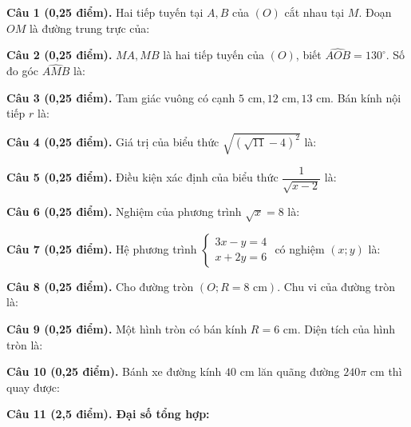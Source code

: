 \documentclass[12pt,a4paper]{article}
\begin{document}
\vspace{1.2mm}
\noindent\textbf{Câu 1 (0,25 điểm).} Hai tiếp tuyến tại $A, B$ của $(O)$ cắt nhau tại $M$. Đoạn $OM$ là đường trung trực của: \par\vspace{0.5mm}
\noindent\textbf{Câu 2 (0,25 điểm).} $MA, MB$ là hai tiếp tuyến của $(O)$, biết $\widehat{AOB} = 130^\circ$. Số đo góc $\widehat{AMB}$ là: \par\vspace{0.5mm}
\noindent\textbf{Câu 3 (0,25 điểm).} Tam giác vuông có cạnh $5\text{ cm}, 12\text{ cm}, 13\text{ cm}$. Bán kính nội tiếp $r$ là: \par\vspace{0.5mm}
\noindent\textbf{Câu 4 (0,25 điểm).} Giá trị của biểu thức $\sqrt{(\sqrt{11} - 4)^2}$ là: \par\vspace{0.5mm}
\noindent\textbf{Câu 5 (0,25 điểm).} Điều kiện xác định của biểu thức $\dfrac{1}{\sqrt{x - 2}}$ là: \par\vspace{0.5mm}
\noindent\textbf{Câu 6 (0,25 điểm).} Nghiệm của phương trình $\sqrt{x} = 8$ là: \par\vspace{0.5mm}
\noindent\textbf{Câu 7 (0,25 điểm).} Hệ phương trình $\begin{cases} 3x - y = 4 \\ x + 2y = 6 \end{cases}$ có nghiệm $(x; y)$ là: \par\vspace{0.5mm}
\noindent\textbf{Câu 8 (0,25 điểm).} Cho đường tròn $(O; R = 8\text{ cm})$. Chu vi của đường tròn là: \par\vspace{0.5mm}
\noindent\textbf{Câu 9 (0,25 điểm).} Một hình tròn có bán kính $R = 6\text{ cm}$. Diện tích của hình tròn là: \par\vspace{0.5mm}
\noindent\textbf{Câu 10 (0,25 điểm).} Bánh xe đường kính $40\text{ cm}$ lăn quãng đường $240\pi\text{ cm}$ thì quay được: \par\vspace{0.5mm}
\vspace{0.8mm}
\noindent\textbf{Câu 11 (2,5 điểm). Đại số tổng hợp:}
\vspace{0.6mm}
\end{document}
